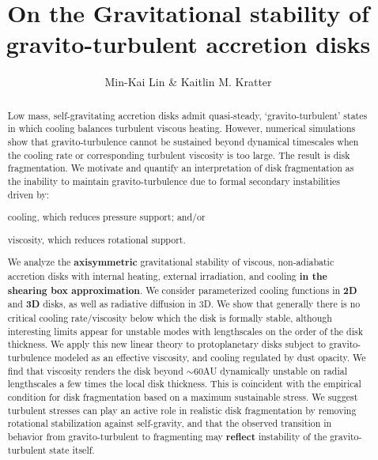 \documentclass[iop, numberedappendix]{emulateapj}
\begin{document}
\title{On the Gravitational stability of gravito-turbulent accretion disks}
\author{Min-Kai Lin \& Kaitlin M. Kratter}

\begin{abstract}
  Low mass, self-gravitating accretion disks admit quasi-steady,
  `gravito-turbulent' states in which cooling balances turbulent viscous 
  heating. However, numerical simulations show that gravito-turbulence
  cannot be sustained beyond dynamical timescales when the cooling
  rate or corresponding turbulent viscosity is too large. The result is disk fragmentation.         
  We motivate and quantify an interpretation of disk 
  fragmentation as the inability to maintain gravito-turbulence due to  
  formal secondary instabilities driven by:  
\begin{inparaenum}[1)] 
\item 
  cooling, which reduces pressure support; and/or
\item 
  viscosity, which reduces rotational support. 
\end{inparaenum}
We analyze the {\bf axisymmetric} gravitational stability of viscous, non-adiabatic
accretion disks with internal heating, external irradiation, and
cooling {\bf in the shearing box approximation}.   
We consider parameterized cooling functions in {\bf 2D} and {\bf 3D}
disks, %
as well as   
radiative diffusion in 3D. We show that 
generally there is no critical cooling rate/viscosity below which 
the disk is formally stable, although interesting limits appear 
for unstable modes with lengthscales on the order of the disk thickness.   
We apply this new linear theory to protoplanetary disks subject to
gravito-turbulence modeled as an effective 
viscosity, and cooling regulated by dust opacity. 
We find that viscosity renders the disk beyond $\sim 60$AU dynamically
unstable on radial %
lengthscales a few times the local disk thickness. This is coincident 
with the empirical condition for disk fragmentation based on a
maximum sustainable stress. 
We suggest turbulent stresses can play an active role in realistic disk 
fragmentation by removing rotational stabilization against 
self-gravity, and that the observed transition in behavior from 
gravito-turbulent to fragmenting may {\bf reflect}   
instability of the gravito-turbulent state itself.
\end{abstract}
\end{document}
